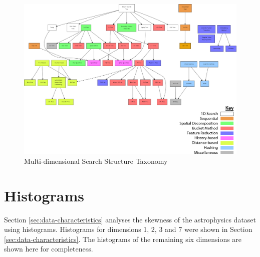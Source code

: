 \begin{landscape}
	\null  %
	\nointerlineskip  %
	\vfill
	\let\snewpage \newpage
	\let\newpage \relax
		\begin{figure}[H]
			\centering
			\includegraphics[scale=0.35]{figures/md_structure_taxonomy.png}
			\caption{Multi-dimensional Search Structure Taxonomy}
			\label{fig:structure-taxonomy}
		\end{figure}
	\let \newpage \snewpage
	\vfill 
	\break %

	\newpage

\end{landscape}

\section{Histograms}
\label{sec:app-histograms}

Section \ref{sec:data-characteristics} analyses the skewness of the astrophysics dataset using histograms. Histograms for dimensions 1, 2, 3 and 7 were shown in Section \ref{sec:data-characteristics}. The histograms of the remaining six dimensions are shown here for completeness.

